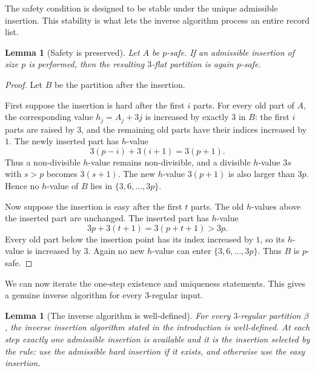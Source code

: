 \documentclass[11pt]{amsart}
\newtheorem{lemma}[theorem]{Lemma}
\theoremstyle{definition}
\theoremstyle{remark}
\begin{document}
The safety condition is designed to be stable under the unique admissible insertion.  This stability is what lets the inverse algorithm process an entire record list.

\begin{lemma}[Safety is preserved]\label{lem:safety-preserved}
Let \(A\) be \(p\)-safe.  If an admissible insertion of size \(p\) is performed,
then the resulting \(3\)-flat partition is again \(p\)-safe.
\end{lemma}

\begin{proof}
Let \(B\) be the partition after the insertion.

First suppose the insertion is hard after the first \(i\) parts.  For every old
part of \(A\), the corresponding value \(h_j=A_j+3j\) is increased by exactly
\(3\) in \(B\): the first \(i\) parts are raised by \(3\), and the remaining
old parts have their indices increased by \(1\).  The newly inserted part has
\(h\)-value
\[
        3(p-i)+3(i+1)=3(p+1).
\]
Thus a non-divisible \(h\)-value remains non-divisible, and a divisible
\(h\)-value \(3s\) with \(s>p\) becomes \(3(s+1)\).  The new \(h\)-value
\(3(p+1)\) is also larger than \(3p\).  Hence no \(h\)-value of \(B\) lies in
\(\{3,6,\ldots,3p\}\).

Now suppose the insertion is easy after the first \(t\) parts.  The old
\(h\)-values above the inserted part are unchanged.  The inserted part has
\(h\)-value
\[
        3p+3(t+1)=3(p+t+1)>3p.
\]
Every old part below the insertion point has its index increased by \(1\), so
its \(h\)-value is increased by \(3\).  Again no new \(h\)-value can enter
\(\{3,6,\ldots,3p\}\).  Thus \(B\) is \(p\)-safe.
\end{proof}

We can now iterate the one-step existence and uniqueness statements.  This gives a genuine inverse algorithm for every $3$-regular input.

\begin{lemma}[The inverse algorithm is well-defined]\label{lem:well-defined-inverse}
For every \(3\)-regular partition \(\beta\), the inverse insertion algorithm
stated in the introduction is well-defined.  At each step exactly one
admissible insertion is available and it is the insertion selected by the rule:
use the admissible hard insertion if it exists, and otherwise use the easy
insertion.
\end{lemma}
\end{document}
